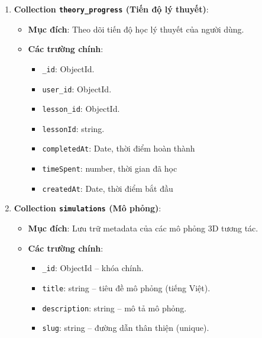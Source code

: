 \begin{enumerate}
    \item \textbf{Collection \texttt{theory\_progress} (Tiến độ lý thuyết)}:
    \begin{itemize}
        \item \textbf{Mục đích}: Theo dõi tiến độ học lý thuyết của người dùng.
    
        \item \textbf{Các trường chính}:
        \begin{itemize}
            \item \texttt{\_id}: ObjectId.
    
            \item \texttt{user\_id}: ObjectId.
    
            \item \texttt{lesson\_id}: ObjectId.
    
            \item \texttt{lessonId}: string.
    
            \item \texttt{completedAt}: Date, thời điểm hoàn thành
    
            \item \texttt{timeSpent}: number, thời gian đã học
    
            \item \texttt{createdAt}: Date, thời điểm bắt đầu
        \end{itemize}
    \end{itemize}
    
    \item \textbf{Collection \texttt{simulations} (Mô phỏng)}:
    \begin{itemize}
        \item \textbf{Mục đích}: Lưu trữ metadata của các mô phỏng 3D tương tác.
    
        \item \textbf{Các trường chính}:
        \begin{itemize}
            \item \texttt{\_id}: ObjectId – khóa chính.
    
            \item \texttt{title}: string – tiêu đề mô phỏng (tiếng Việt).
    
            \item \texttt{description}: string – mô tả mô phỏng.
    
            \item \texttt{slug}: string – đường dẫn thân thiện (unique).
    

\end{itemize}
\end{itemize}
\end{enumerate}
